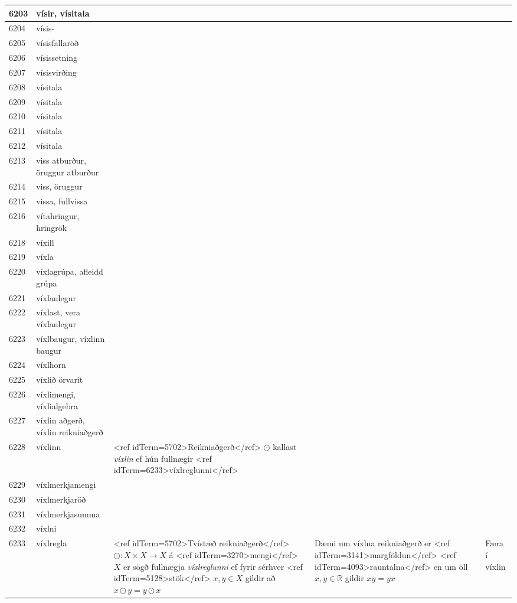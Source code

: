 \begin{longtable}{p{}|p{}|p{}|p{}|p{}}
\hline
6203 & vísir, vísitala &  &  &  \\
\hline
6204 & vísis- &  &  &  \\
\hline
6205 & vísisfallaröð &  &  &  \\
\hline
6206 & vísissetning &  &  &  \\
\hline
6207 & vísisvirðing &  &  &  \\
\hline
6208 & vísitala &  &  &  \\
\hline
6209 & vísitala &  &  &  \\
\hline
6210 & vísitala &  &  &  \\
\hline
6211 & vísitala &  &  &  \\
\hline
6212 & vísitala &  &  &  \\
\hline
6213 & viss atburður, öruggur atburður &  &  &  \\
\hline
6214 & viss, öruggur &  &  &  \\
\hline
6215 & vissa, fullvissa &  &  &  \\
\hline
6216 & vítahringur, hringrök &  &  &  \\
\hline
6218 & víxill &  &  &  \\
\hline
6219 & víxla &  &  &  \\
\hline
6220 & víxlagrúpa, afleidd grúpa &  &  &  \\
\hline
6221 & víxlanlegur &  &  &  \\
\hline
6222 & víxlast, vera víxlanlegur &  &  &  \\
\hline
6223 & víxlbaugur, víxlinn baugur &  &  &  \\
\hline
6224 & víxlhorn &  &  &  \\
\hline
6225 & víxlið örvarit &  &  &  \\
\hline
6226 & víxlimengi, víxlialgebra &  &  &  \\
\hline
6227 & víxlin aðgerð, víxlin reikniaðgerð &  &  &  \\
\hline
6228 & víxlinn & <ref idTerm=5702>Reikniaðgerð</ref> $\odot$ kallast \textit{víxlin} ef hún fullnægir <ref idTerm=6233>víxlreglunni</ref> &  &  \\
\hline
6229 & víxlmerkjamengi &  &  &  \\
\hline
6230 & víxlmerkjaröð &  &  &  \\
\hline
6231 & víxlmerkjasumma &  &  &  \\
\hline
6232 & víxlni &  &  &  \\
\hline
6233 & víxlregla & <ref idTerm=5702>Tvístæð reikniaðgerð</ref> $\odot : X \times X \to X$ á <ref idTerm=3270>mengi</ref> $X$ er sögð fullnægja \textit{víxlreglunni} ef fyrir sérhver <ref idTerm=5128>stök</ref> $x,y \in X$ gildir að $x \odot y = y \odot x$ & Dæmi um víxlna reikniaðgerð er <ref idTerm=3141>margföldun</ref> <ref idTerm=4093>rauntalna</ref> en um öll $x,y \in \mathbb{R}$ gildir $xy=yx$ & Færa í víxlin \\

\end{longtable}
